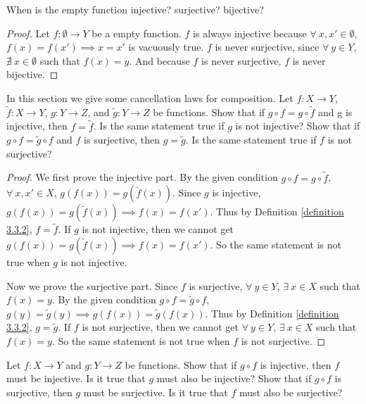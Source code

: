 \begin{exercise}\label{exercise 3.3.3}
When is the empty function injective?
surjective?
bijective?
\end{exercise}

\begin{proof}
Let \(f : \emptyset \to Y\) be a empty function.
\(f\) is always injective because \(\forall\ x, x' \in \emptyset\), \(f(x) = f(x') \implies x = x'\) is vacuously true.
\(f\) is never surjective, since \(\forall\ y \in Y\), \(\nexists\ x \in \emptyset\) such that \(f(x) = y\).
And because \(f\) is never surjective, \(f\) is never bijective.
\end{proof}

\begin{exercise}\label{exercise 3.3.4}
In this section we give some cancellation laws for composition.
Let \(f : X \to Y\), \(\tilde{f} : X \to Y\), \(g : Y \to Z\), and \(\tilde{g} : Y \to Z\) be functions.
Show that if \(g \circ f = g \circ \tilde{f}\) and g is injective, then \(f = \tilde{f}\).
Is the same statement true if \(g\) is not injective?
Show that if \(g \circ f = \tilde{g} \circ f\) and \(f\) is surjective, then \(g = \tilde{g}\).
Is the same statement true if \(f\) is not surjective?
\end{exercise}

\begin{proof}
We first prove the injective part.
By the given condition \(g \circ f = g \circ \tilde{f}\), \(\forall\ x, x' \in X\), \(g(f(x)) = g(\tilde{f}(x))\).
Since \(g\) is injective, \(g(f(x)) = g(\tilde{f}(x)) \implies f(x) = f(x')\).
Thus by Definition \ref{definition 3.3.2}, \(f = \tilde{f}\).
If \(g\) is not injective, then we cannot get \(g(f(x)) = g(\tilde{f}(x)) \implies f(x) = f(x')\).
So the same statement is not true when \(g\) is not injective.

Now we prove the surjective part.
Since \(f\) is surjective, \(\forall\ y \in Y\), \(\exists\ x \in X\) such that \(f(x) = y\).
By the given condition \(g \circ f = \tilde{g} \circ f\), \(g(y) = \tilde{g}(y) \implies g(f(x)) = \tilde{g}(f(x))\).
Thus by Definition \ref{definition 3.3.2}, \(g = \tilde{g}\).
If \(f\) is not surjective, then we cannot get \(\forall\ y \in Y\), \(\exists\ x \in X\) such that \(f(x) = y\).
So the same statement is not true when \(f\) is not surjective.
\end{proof}

\begin{exercise}\label{exercise 3.3.5}
Let \(f : X \to Y\) and \(g : Y \to Z\) be functions.
Show that if \(g \circ f\) is injective, then \(f\) must be injective.
Is it true that \(g\) must also be injective?
Show that if \(g \circ f\) is surjective, then \(g\) must be surjective.
Is it true that \(f\) must also be surjective?
\end{exercise}

